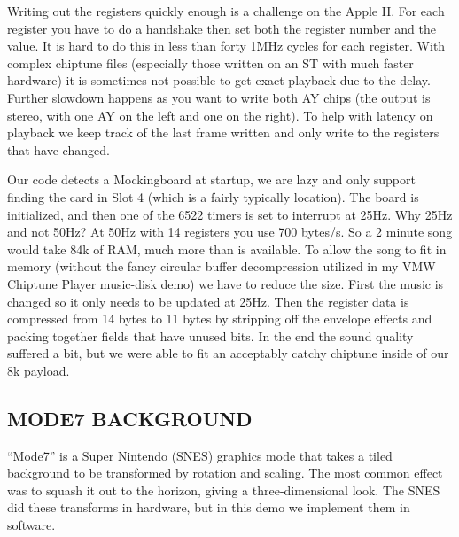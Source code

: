 \documentclass[twocolumn]{article}
\begin{document}
Writing out the registers quickly enough is a challenge on the Apple II.
For each register you have to do a handshake then set both the register 
number and the value.
It is hard to do this in less than forty 1MHz cycles for each register.
With complex chiptune files (especially those written on an ST with much
faster hardware) it is sometimes not possible to get exact playback
due to the delay.
Further slowdown happens as you want to write both AY chips (the output
is stereo, with one AY on the left and one on the right).
To help with latency on playback we keep track of the last frame written
and only write to the registers that have changed.


Our code detects a Mockingboard at startup, we are lazy and only support
finding the card in Slot 4 (which is a fairly typically location).
The board is initialized, and then one of the 6522 timers is set to
interrupt at 25Hz.
Why 25Hz and not 50Hz?  At 50Hz with 14 registers you use 700 bytes/s.
So a 2 minute song would take 84k of RAM, much more than is available.
To allow the song to fit in memory (without the fancy circular buffer
decompression utilized in my VMW Chiptune Player music-disk demo) we have
to reduce the size.
First the music is changed so it only needs to be updated at 25Hz.
Then the register data is compressed from 14 bytes to 11 bytes by stripping off
the envelope effects and packing together fields that have unused bits.
In the end the sound quality suffered a bit, but we were able to fit an
acceptably catchy chiptune inside of our 8k payload.

\subsection{MODE7 BACKGROUND}

``Mode7'' is a Super Nintendo (SNES) graphics mode that takes a tiled
background to be transformed by rotation and scaling.
The most common effect was to squash it out to the horizon, giving
a three-dimensional look.
The SNES did these transforms in hardware, but in this demo we implement
them in software.
\end{document}
